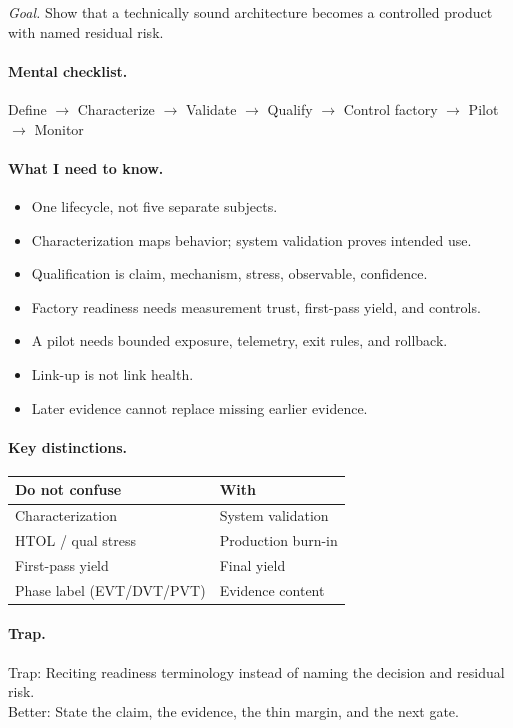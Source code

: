 \textit{Goal.} Show that a technically sound architecture becomes a controlled
product with named residual risk.

\paragraph{Mental checklist.}
Define $\rightarrow$ Characterize $\rightarrow$ Validate $\rightarrow$ Qualify
$\rightarrow$ Control factory $\rightarrow$ Pilot $\rightarrow$ Monitor

\paragraph{What I need to know.}
\begin{itemize}
\item One lifecycle, not five separate subjects.
\item Characterization maps behavior; system validation proves intended use.
\item Qualification is claim, mechanism, stress, observable, confidence.
\item Factory readiness needs measurement trust, first-pass yield, and controls.
\item A pilot needs bounded exposure, telemetry, exit rules, and rollback.
\item Link-up is not link health.
\item Later evidence cannot replace missing earlier evidence.
\end{itemize}

\paragraph{Key distinctions.}
\begin{center}
\footnotesize
\begin{tabular}{@{}ll@{}}
\toprule
Do not confuse & With \\
\midrule
Characterization & System validation \\
HTOL / qual stress & Production burn-in \\
First-pass yield & Final yield \\
Phase label (EVT/DVT/PVT) & Evidence content \\
\bottomrule
\end{tabular}
\end{center}

\paragraph{Trap.}
Trap: Reciting readiness terminology instead of naming the decision and
residual risk.\\
Better: State the claim, the evidence, the thin margin, and the next gate.

